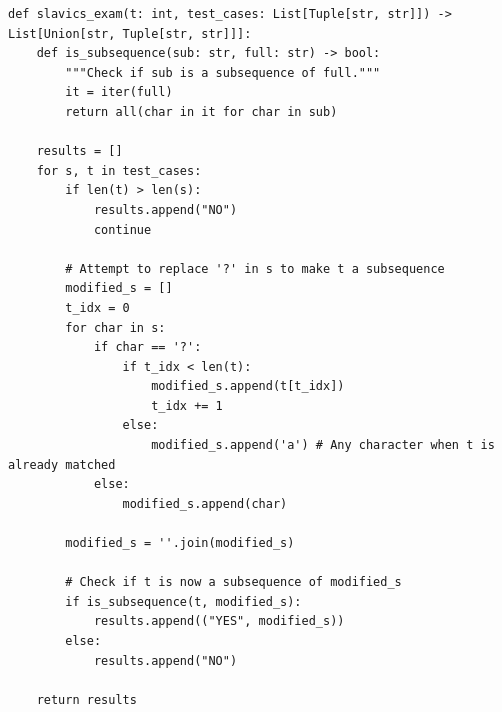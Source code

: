 \documentclass[acmsmall,screen,nonacm]{acmart}
\begin{document}
{\scriptsize
\begin{tcolorbox}[mybox,breakable,title={Dominant error (probability 0.23)}]
\begin{verbatim}
def slavics_exam(t: int, test_cases: List[Tuple[str, str]]) -> List[Union[str, Tuple[str, str]]]:
    def is_subsequence(sub: str, full: str) -> bool:
        """Check if sub is a subsequence of full."""
        it = iter(full)
        return all(char in it for char in sub)

    results = []
    for s, t in test_cases:
        if len(t) > len(s):
            results.append("NO")
            continue

        # Attempt to replace '?' in s to make t a subsequence
        modified_s = []
        t_idx = 0
        for char in s:
            if char == '?':
                if t_idx < len(t):
                    modified_s.append(t[t_idx])
                    t_idx += 1
                else:
                    modified_s.append('a') # Any character when t is already matched
            else:
                modified_s.append(char)
        
        modified_s = ''.join(modified_s)

        # Check if t is now a subsequence of modified_s
        if is_subsequence(t, modified_s):
            results.append(("YES", modified_s))
        else:
            results.append("NO")

    return results
\end{verbatim}
\end{tcolorbox}
}
\end{document}
